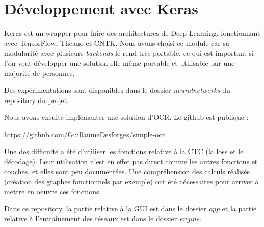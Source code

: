 \documentclass{report}
\begin{document}
\section{Développement avec Keras}

Keras est un wrapper pour faire des architectures de Deep Learning, fonctionnant avec TensorFlow, Theano et CNTK.
Nous avons choisi ce module car sa modularité avec plusieurs \emph{backends} le rend très portable, ce qui est important si l'on veut développer une solution elle-même portable et utilisable par une majorité de personnes.

Des expérimentations sont disponibles dans le dossier \textit{neuralnetworks} du repository du projet.

Nous avons ensuite implémenter une solution d'OCR. Le github est publique :

https://github.com/GuillaumeDesforges/simple-ocr

Une des difficulté a été d'utiliser les fonctions relative à la CTC (la loss et le décodage).
Leur utilisation n'est en effet pas direct comme les autres fonctions et couches, et elles sont peu documentées.
Une compréhension des calculs réalisés (création des graphes fonctionnels par exemple) ont été nécessaires pour arriver à mettre en oeuvre ces fonctions.

Dans ce repository, la partie relative à la GUI est dans le dossier \textit{app} et la partie relative à l'entraînement des réseaux est dans le dossier \textit{engine}.

\appendix
\end{document}
